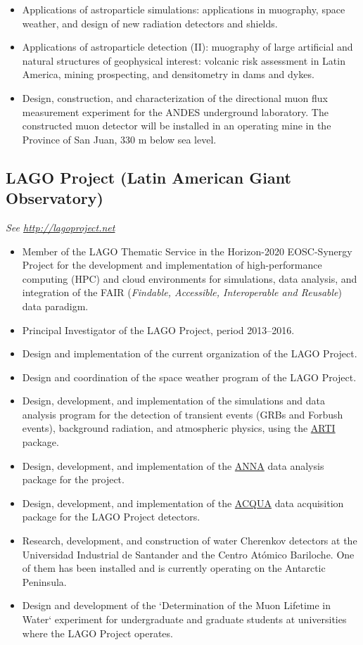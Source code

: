 \begin{itemize}
\item Applications of astroparticle simulations: applications in muography, space weather, and design of new radiation detectors and shields.
\item Applications of astroparticle detection (II): muography of large artificial and natural structures of geophysical interest: volcanic risk assessment in Latin America, mining prospecting, and densitometry in dams and dykes.
\item Design, construction, and characterization of the directional muon flux measurement experiment for the ANDES underground laboratory. The constructed muon detector will be installed in an operating mine in the Province of San Juan, 330 m below sea level.
\end{itemize}

\subsection*{LAGO Project (Latin American Giant Observatory)}
{\small{\textit{See \href{http://lagoproject.net}{http://lagoproject.net}}}}
\begin{itemize}
\item Member of the LAGO Thematic Service in the Horizon-2020 EOSC-Synergy Project for the development and implementation of high-performance computing (HPC) and cloud environments for simulations, data analysis, and integration of the FAIR (\emph{Findable, Accessible, Interoperable and Reusable}) data paradigm.
\item Principal Investigator of the LAGO Project, period 2013--2016.
\item Design and implementation of the current organization of the LAGO Project.
\item Design and coordination of the space weather program of the LAGO Project.
\item Design, development, and implementation of the simulations and data analysis program for the detection of transient events (GRBs and Forbush events), background radiation, and atmospheric physics, using the \href{https://github.com/lagoproject/arti}{ARTI} package.
\item Design, development, and implementation of the \href{https://github.com/lagoproject/anna}{ANNA} data analysis package for the project.
\item Design, development, and implementation of the \href{https://github.com/lagoproject/acqua}{ACQUA} data acquisition package for the LAGO Project detectors.
\item Research, development, and construction of water Cherenkov detectors at the Universidad Industrial de Santander and the Centro Atómico Bariloche. One of them has been installed and is currently operating on the Antarctic Peninsula.
\item Design and development of the `Determination of the Muon Lifetime in Water` experiment for undergraduate and graduate students at universities where the LAGO Project operates.
\end{itemize}

